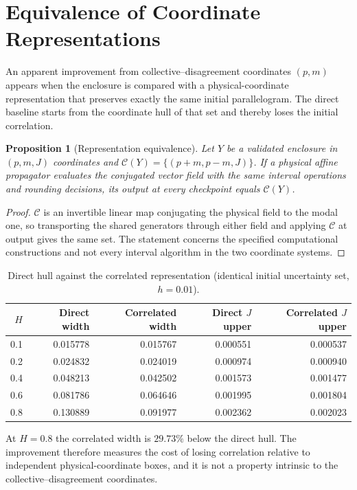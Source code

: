 \documentclass[11pt,notitlepage]{report}
\newtheorem{proposition}[theorem]{Proposition}
\theoremstyle{definition}
\theoremstyle{remark}
\begin{document}
\section{Equivalence of Coordinate Representations}
An apparent improvement from collective--disagreement coordinates $(p,m)$ appears when the enclosure is compared with a physical-coordinate representation that preserves exactly the same initial parallelogram. The direct baseline starts from the coordinate hull of that set and thereby loses the initial correlation.
\begin{proposition}[Representation equivalence]\label{prop:equiv}
Let $Y$ be a validated enclosure in $(p,m,J)$ coordinates and $\mathcal C(Y)=\{(p+m,p-m,J)\}$. If a physical affine propagator evaluates the conjugated vector field with the same interval operations and rounding decisions, its output at every checkpoint equals $\mathcal C(Y)$.
\end{proposition}
\begin{proof}
$\mathcal C$ is an invertible linear map conjugating the physical field to the modal one, so transporting the shared generators through either field and applying $\mathcal C$ at output gives the same set. The statement concerns the specified computational constructions and not every interval algorithm in the two coordinate systems.
\end{proof}
\begin{table}[ht]\centering\small
\caption{Direct hull against the correlated representation (identical initial uncertainty set, $h=0.01$).}
\begin{tabular}{rrrrr}\toprule
$H$&Direct width&Correlated width&Direct $J$ upper&Correlated $J$ upper\\\midrule
0.1&0.015778&0.015767&0.000551&0.000537\\
0.2&0.024832&0.024019&0.000974&0.000940\\
0.4&0.048213&0.042502&0.001573&0.001477\\
0.6&0.081786&0.064646&0.001995&0.001804\\
0.8&0.130889&0.091977&0.002362&0.002023\\\bottomrule
\end{tabular}
\end{table}
At $H=0.8$ the correlated width is $29.73\%$ below the direct hull. The improvement therefore measures the cost of losing correlation relative to independent physical-coordinate boxes, and it is not a property intrinsic to the collective--disagreement coordinates.
\end{document}
